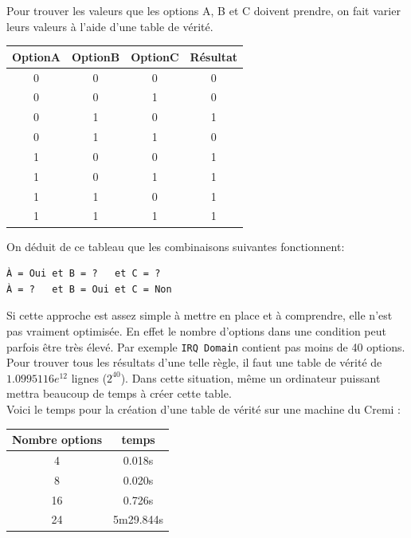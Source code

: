 ﻿\documentclass[17pts]{report}
\begin{document}
Pour trouver les valeurs que les options A, B et C doivent prendre, on fait
varier leurs valeurs à l'aide d'une table de vérité.  \\
\newline
\begin{tabular}{|c|c|c||c|}
    \hline
    OptionA & OptionB & OptionC & Résultat\\
    \hline
    \hline
    0 & 0 & 0 & 0\\
    \hline
    0 & 0 & 1 & 0\\
    \hline
    0 & 1 & 0 & 1\\
    \hline
    0 & 1 & 1 & 0\\
    \hline
    1 & 0 & 0 & 1\\
    \hline
    1 & 0 & 1 & 1\\
    \hline
    1 & 1 & 0 & 1\\
    \hline
    1 & 1 & 1 & 1\\
    \hline
\end{tabular}
\newline
\newline

On déduit de ce tableau que les combinaisons suivantes fonctionnent:
\begin{verbatim}
À = Oui et B = ?   et C = ?
À = ?   et B = Oui et C = Non
\end{verbatim}

Si cette approche est assez simple à mettre en place et à comprendre, elle
n'est pas vraiment optimisée. En effet le nombre d'options dans une condition
peut parfois être très élevé. Par exemple \verb|IRQ Domain| contient pas
moins de 40 options.\\
Pour trouver tous les résultats d'une telle règle, il faut une table
de vérité de $1.0995116e^{12}$ lignes ($2^{40}$). Dans cette situation, même
un ordinateur puissant mettra beaucoup de temps à créer cette table.
\\
Voici le temps pour la création d'une table de vérité sur une machine du Cremi :
\\

\begin{tabular}{|c|c|}
    \hline
    Nombre options & temps\\
    \hline
    \hline
    4 & 0.018s\\
    \hline
    8 & 0.020s\\
    \hline
    16 & 0.726s\\
    \hline
    24 & 5m29.844s\\
    \hline
\end{tabular}
\newline
\newline
\end{document}

